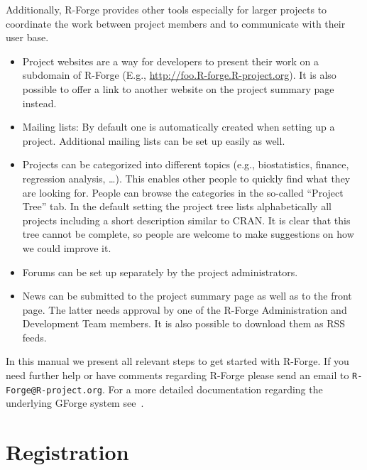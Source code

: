 \documentclass[a4paper]{article}
\newcommand{\RFORGE}{R-Forge Administration and Development Team}
\let\email=\texttt
\begin{document}
Additionally, R-Forge provides other tools especially for larger
projects to coordinate the work between project members and to
communicate with their user base.

\begin{itemize}
\item Project websites are a way for developers to present their work
  on a subdomain of R-Forge (E.g.,
  \url{http://foo.R-forge.R-project.org}). It is also possible to
  offer a link to another website on the project summary page instead. 
\item Mailing lists: By default one is automatically created when setting up a
  project. Additional mailing lists can be set up easily as well. 
\item Projects can be categorized into different
  topics (e.g., biostatistics, finance, regression analysis,
  \ldots). This enables other people to quickly find what they are
  looking for. People can browse the categories in the so-called
  ``Project Tree'' tab. In the default setting the project tree lists
  alphabetically all projects including a short description similar to
  CRAN. It is clear that this tree cannot be complete, so people are
  welcome to make suggestions on how we could improve it. 
\item Forums can be set up separately by the project
  administrators.%
\item News can be submitted to the project summary page as well as to the
  front page. The latter needs approval by one of the \RFORGE{}
  members. It is also possible to download them as RSS feeds.
\end{itemize} 


In this manual we present all relevant steps to get
started with R-Forge. If you need further help or have
comments regarding R-Forge please send an email to
\email{R-Forge@R-project.org}. For a more detailed
documentation regarding the underlying GForge system
see~\cite{forge:copeland_et_al:2006}. 

\section{Registration}
\label{sec:registration}
\end{document}
